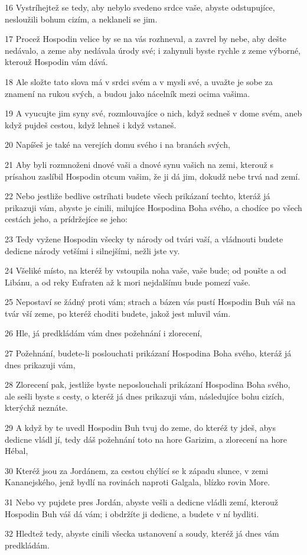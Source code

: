 \par 16 Vystríhejtež se tedy, aby nebylo svedeno srdce vaše, abyste odstupujíce, nesloužili bohum cizím, a neklaneli se jim.
\par 17 Procež Hospodin velice by se na vás rozhneval, a zavrel by nebe, aby dešte nedávalo, a zeme aby nedávala úrody své; i zahynuli byste rychle z zeme výborné, kterouž Hospodin vám dává.
\par 18 Ale složte tato slova má v srdci svém a v mysli své, a uvažte je sobe za znamení na rukou svých, a budou jako nácelník mezi ocima vašima.
\par 19 A vyucujte jim syny své, rozmlouvajíce o nich, když sedneš v dome svém, aneb když pujdeš cestou, když lehneš i když vstaneš.
\par 20 Napíšeš je také na verejích domu svého i na branách svých,
\par 21 Aby byli rozmnoženi dnové vaši a dnové synu vašich na zemi, kterouž s prísahou zaslíbil Hospodin otcum vašim, že ji dá jim, dokudž nebe trvá nad zemí.
\par 22 Nebo jestliže bedlive ostríhati budete všech prikázaní techto, kteráž já prikazuji vám, abyste je cinili, milujíce Hospodina Boha svého, a chodíce po všech cestách jeho, a prídržejíce se jeho:
\par 23 Tedy vyžene Hospodin všecky ty národy od tvári vaší, a vládnouti budete dedicne národy vetšími i silnejšími, nežli jste vy.
\par 24 Všeliké místo, na kteréž by vstoupila noha vaše, vaše bude; od poušte a od Libánu, a od reky Eufraten až k mori nejdalšímu bude pomezí vaše.
\par 25 Nepostaví se žádný proti vám; strach a bázen vás pustí Hospodin Buh váš na tvár vší zeme, po kteréž choditi budete, jakož jest mluvil vám.
\par 26 Hle, já predkládám vám dnes požehnání i zlorecení,
\par 27 Požehnání, budete-li poslouchati prikázaní Hospodina Boha svého, kteráž já dnes prikazuji vám,
\par 28 Zlorecení pak, jestliže byste neposlouchali prikázaní Hospodina Boha svého, ale sešli byste s cesty, o kteréž já dnes prikazuji vám, následujíce bohu cizích, kterýchž neznáte.
\par 29 A když by te uvedl Hospodin Buh tvuj do zeme, do kteréž ty jdeš, abys dedicne vládl jí, tedy dáš požehnání toto na hore Garizim, a zlorecení na hore Hébal,
\par 30 Kteréž jsou za Jordánem, za cestou chýlící se k západu slunce, v zemi Kananejského, jenž bydlí na rovinách naproti Galgala, blízko rovin More.
\par 31 Nebo vy pujdete pres Jordán, abyste vešli a dedicne vládli zemí, kterouž Hospodin Buh váš dá vám; i obdržíte ji dedicne, a budete v ní bydliti.
\par 32 Hledtež tedy, abyste cinili všecka ustanovení a soudy, kteréž já dnes vám predkládám.

